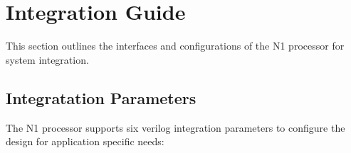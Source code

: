 
\section{Integration Guide}
\label{integration}

This section outlines the interfaces and configurations of the N1 processor
for system integration.

\subsection{Integratation Parameters}
\label{integration:params}

The N1 processor supports six \gls{verilog} integration parameters to configure
the design for application specific needs:

